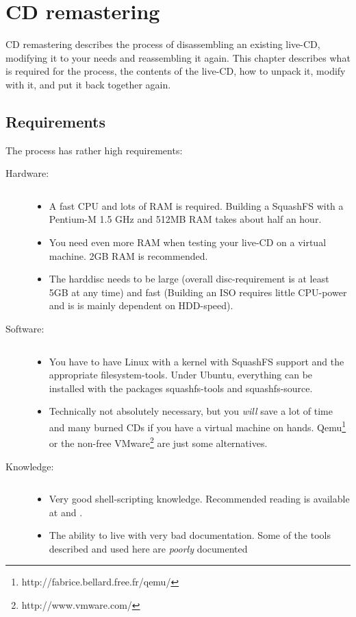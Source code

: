 
\chapter{CD remastering}\label{chapter:CD remastering}
CD remastering describes the process of disassembling an existing live-CD,
modifying it to your needs and reassembling it again. This chapter describes
what is required for the process, the contents of the live-CD, how to unpack it,
modify with it, and put it back together again.

\section{Requirements}
The process has rather high requirements:
\begin{description}
 \item[Hardware:] $\qquad$
   \begin{itemize}
    \item A fast CPU and lots of RAM is required. Building a SquashFS with a
      Pentium-M 1.5 GHz and 512MB RAM takes about half an hour.
    \item You need even more RAM when testing your live-CD on a virtual
      machine. 2GB RAM is recommended.
    \item The harddisc needs to be large (overall disc-requirement is at least
      5GB at any time) and fast (Building an ISO requires little CPU-power and
      is is mainly dependent on HDD-speed).
   \end{itemize}
 \item[Software:] $\qquad$
   \begin{itemize}
     \item You have to have Linux with a kernel with SquashFS support and the
       appropriate filesystem-tools. Under Ubuntu, everything can be installed
       with the packages squashfs-tools and squashfs-source.
     \item Technically not absolutely necessary, but you \emph{will} save a lot
       of time and many burned CDs if you have a virtual machine on hands.
       Qemu\footnote{http://fabrice.bellard.free.fr/qemu/} or the non-free
       VMware\footnote{http://www.vmware.com/} are just some alternatives.
   \end{itemize}
 \item[Knowledge:] $\qquad$
   \begin{itemize}
     \item Very good shell-scripting knowledge. Recommended reading is available at
     	\cite{bash-intro} and \cite{bash-advanced}.
     \item The ability to live with very bad documentation. Some of the tools
       described and used here are \emph{poorly} documented
   \end{itemize}
\end{description}


